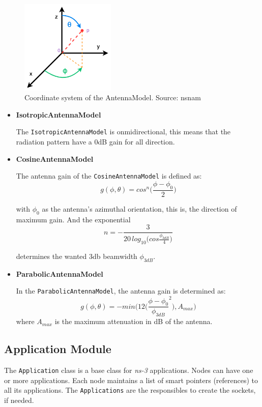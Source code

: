 \begin{figure}[h]
  \centering
  \includegraphics[width=0.4\textwidth]{img/antennamodel.png}
  \caption{Coordinate system of the AntennaModel. Source: nsnam \cite{ns3}}
  \label{fig:ns3antenna}
\end{figure}

\begin{itemize}[itemsep=0pt, topsep=0pt]
  \item \textbf{IsotropicAntennaModel} 
  
  The \texttt{IsotropicAntennaModel} is onmidirectional, this means that the radiation pattern have
  a 0dB gain for all direction.
  \item \textbf{CosineAntennaModel}
  
  The antenna gain of the \texttt{CosineAntennaModel} is defined as:
  \begin{equation}
    g(\phi,\theta)=cos^n \bigg( \frac{\phi-\phi_0}{2} \bigg)
  \end{equation}

  with ${\phi_0}$ as the antenna's azimuthal orientation, this is, the direction of maximum gain. And the exponential
  \begin{equation}
    n=-\frac{3}{20\,log_{10} \big( cos\frac{\phi_{3dB}}{4} \big) }
  \end{equation}

  determines the wanted 3db beamwidth ${\phi_{3dB}}$.
  \item \textbf{ParabolicAntennaModel}

  In the \texttt{ParabolicAntennaModel}, the antenna gain is determined as:
  \begin{equation}
    g(\phi,\theta)=-min \bigg( 12 \bigg( \frac{\phi-\phi_0}{\phi_{3dB}}^2 \bigg) ,A_{max} \bigg)
  \end{equation}
  where ${A_{max}}$ is the maximum attenuation in dB of the antenna. 
\end{itemize}

\subsection{Application Module}
The \texttt{Application} class is a base class for \textit{ns-3} applications. Nodes can
have one or more applications. Each node maintains a list of smart pointers (references) 
to all its applications. The \texttt{Applications} are the responsibles to create the sockets,
if needed.

